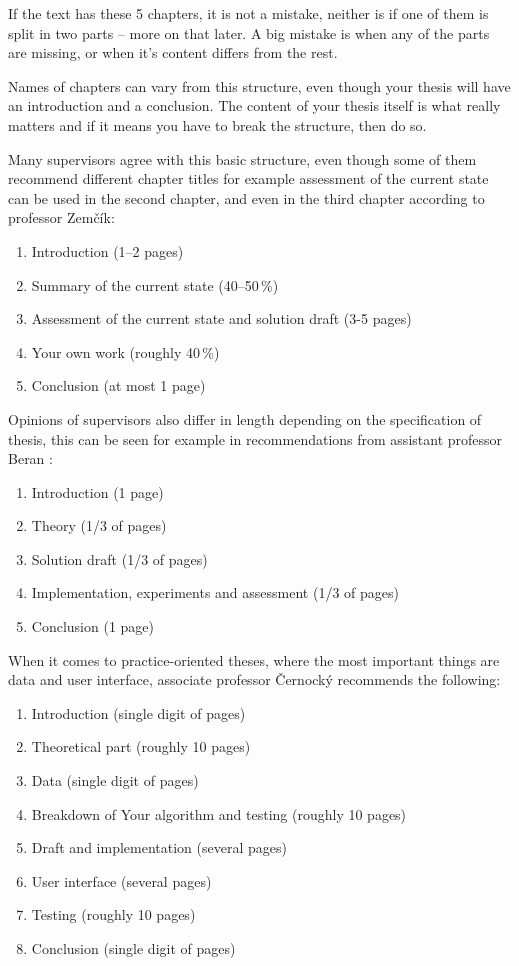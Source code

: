 If the text has these 5 chapters, it is not a mistake, neither is if one of them is split in two parts -- more on that later. A big mistake is when any of the parts are missing, or when it's content differs from the rest.

Names of chapters can vary from this structure, even though your thesis will have an introduction and a conclusion. The content of your thesis itself is what really matters and if it means you have to break the structure, then do so.

Many supervisors agree with this basic structure, even though some of them recommend different chapter titles for example assessment of the current state can be used in the second chapter, and even in the third chapter according to professor Zemčík:
\begin{enumerate}
\item Introduction (1--2 pages)
\item Summary of the current state (40--50\,\%)
\item Assessment of the current state and solution draft (3-5 pages)
\item Your own work (roughly 40\,\%)
\item Conclusion (at most 1 page)
\end{enumerate}

Opinions of supervisors also differ in length depending on the specification of thesis, this can be seen for example in recommendations from assistant professor Beran \cite{Beran}:
\begin{enumerate}
\item Introduction (1 page)
\item Theory (1/3 of pages)
\item Solution draft (1/3 of pages)
\item Implementation, experiments and assessment (1/3 of pages)
\item Conclusion (1 page)
\end{enumerate}

When it comes to practice-oriented theses, where the most important things are data and user interface, associate professor Černocký \cite{Cernocky} recommends the following:
\begin{enumerate}
\item Introduction (single digit of pages)
\item Theoretical part (roughly 10 pages)
\item Data (single digit of pages)
\item Breakdown of Your algorithm and testing (roughly 10 pages)
\item Draft and implementation (several pages)
\item User interface (several pages)
\item Testing (roughly 10 pages)
\item Conclusion (single digit of pages)
\end{enumerate}

